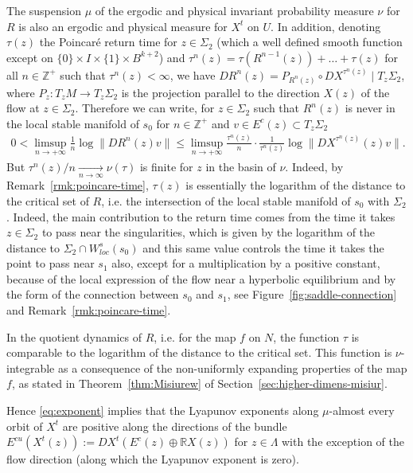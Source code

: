 \documentclass[reqno,12pt,a4paper]{amsart}
\theoremstyle{plain}
\theoremstyle{definition}
\begin{document}
The suspension $\mu$ of the ergodic and physical invariant
probability measure $\nu$ for $R$ is also an ergodic and
physical measure for $X^t$ on $U$. In addition, denoting
$\tau(z)$ the Poincar\'e return time for $z\in\Sigma_2$
(which a well defined smooth function except on $\{0\}\times
I\times\{1\}\times B^{k+2}$) and
$\tau^n(z)=\tau(R^{n-1}(z))+\dots +\tau(z)$ for all
$n\in{{\mathbb Z}}^+$ such that $\tau^n(z)<\infty$, we have
$DR^n(z)=P_{R^n(z)}\circ DX^{\tau^{n}(z)}\mid T_z\Sigma_2$,
where $P_z:T_zM\to T_z\Sigma_2$ is the projection parallel
to the direction $X(z)$ of the flow at
$z\in\Sigma_2$. Therefore we can write, for $z\in\Sigma_2$
such that $R^n(z)$ is never in the local stable manifold of
$s_0$ for $n\in{{\mathbb Z}}^+$ and $v\in E^c(z)\subset T_z\Sigma_2$
\begin{align}\label{eq:exponent}
  0<\limsup_{n\to+\infty}\frac1n\log\|DR^n(z)v\| \le
  \limsup_{n\to+\infty}
  \frac{\tau^n(z)}n\cdot\frac1{\tau^n(z)}\log\|DX^{\tau^n(z)}(z)v\|.
\end{align}
But $\tau^n(z)/n\xrightarrow[n\to\infty]{}\nu(\tau)$ is
finite for $z$ in the basin of $\nu$. Indeed, by
Remark~\ref{rmk:poincare-time}, $\tau(z)$ is essentially the
logarithm of the distance to the critical set of $R$,
i.e. the intersection of the local stable manifold of $s_0$
with $\Sigma_2$. Indeed, the main contribution to the return
time comes from the time it takes $z\in\Sigma_2$ to pass
near the singularities, which is given by the logarithm of
the distance to $\Sigma_2\cap W^s_{loc}(s_0)$ and this same
value controls the time it takes the point to pass near
$s_1$ also, except for a multiplication by a positive
constant, because of the local expression of the flow near a
hyperbolic equilibrium and by the form of the connection
between $s_0$ and $s_1$, see
Figure~\ref{fig:saddle-connection} and
Remark~\ref{rmk:poincare-time}.

In the quotient dynamics of $R$, i.e. for the map $f$ on
$N$, the function $\tau$ is comparable to the logarithm of
the distance to the critical set.
This function is $\nu$-integrable as a
consequence of the non-uniformly expanding properties of the
map $f$, as stated in Theorem~\ref{thm:Misiurew} of
Section~\ref{sec:higher-dimens-misiur}.

Hence \eqref{eq:exponent} implies that the Lyapunov
exponents along $\mu$-almost every orbit of $X^t$ are
positive along the directions of the bundle
$E^{cu}(X^t(z)):=DX^t(E^c(z)\oplus {{\mathbb R}} X(z))$ for
$z\in\Lambda$ with the exception of the flow direction
(along which the Lyapunov exponent is zero).
\end{document}
